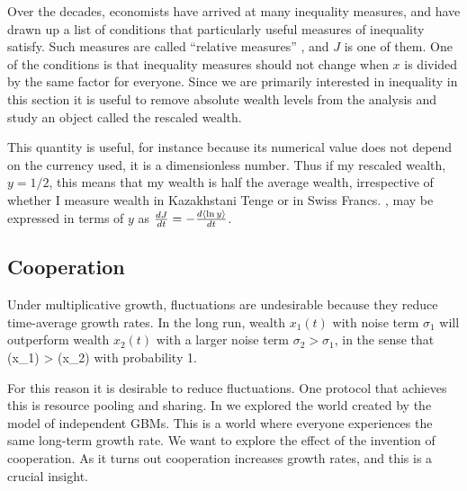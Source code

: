 Over the decades, economists have arrived at many inequality measures, and have drawn 
up a list of conditions that particularly useful measures of inequality satisfy. Such measures
are called ``relative measures'' \cite[Appendix 4]{Sen1997}, and $J$ is one of them. One of the conditions is that inequality measures
should not change when $x$ is divided by the same factor for everyone. Since we are primarily 
interested in inequality in this section it is useful to remove absolute wealth levels from the
analysis and study an object called the rescaled wealth.


This quantity is useful, for instance because its numerical value does not 
depend on the currency used, it is a dimensionless number. 
Thus if my rescaled wealth, $y=1/2$, this means that my wealth is half the 
average wealth, irrespective of whether I measure wealth in Kazakhstani Tenge 
or in Swiss Francs. , may be expressed in 
terms of $y$ as $\frac{dJ}{dt}=-\frac{d\left\langle\ln y \right\rangle}{dt}$. 




\subsection{Cooperation}
Under multiplicative growth, fluctuations are undesirable because they reduce 
time-average growth rates. In the long run, wealth $x_1(t)$ with noise term 
$\sigma_1$ will outperform wealth $x_2(t)$ with a larger 
noise term $\sigma_2>\sigma_1$, in the sense that 
\be
\gt(x_1) > \gt(x_2)
\ee
with probability 1.

For this reason it is desirable to reduce fluctuations. One protocol that achieves this is 
resource pooling and sharing. In  we explored the world created 
by the model of independent GBMs. This is a world where everyone experiences the 
same long-term growth rate. We want to explore the effect of the invention of 
cooperation. As it turns out cooperation increases growth rates, and this is a 
crucial insight. 

